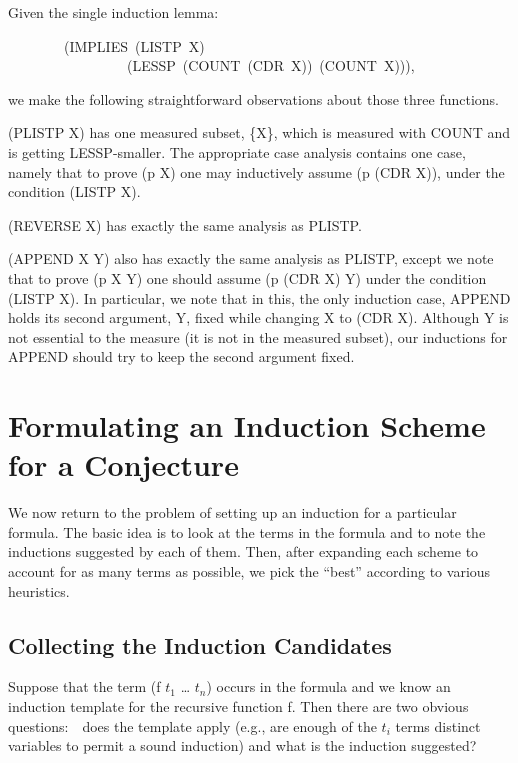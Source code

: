 \documentclass[10pt]{book}
\newenvironment{pubasis}{\begin{flushleft}}{\end{flushleft}}
\begin{document}
Given the single induction lemma:
\begin{pubasis}
~~~~~~~~(IMPLIES~(LISTP~X)\\
~~~~~~~~~~~~~~~~~(LESSP~(COUNT~(CDR~X))~(COUNT~X))),\\
\end{pubasis}
we make
the following straightforward observations about those three functions.

(PLISTP X) has one measured subset, \{X\}, which is measured with COUNT
and is getting LESSP-smaller.  The appropriate case analysis contains
one case, namely that to prove (p X) one may inductively assume (p (CDR X)),
under the condition (LISTP X).

(REVERSE X) has exactly the same analysis as PLISTP.

(APPEND X Y) also has exactly the same analysis as PLISTP, except
we note that to prove (p X Y) one should assume (p (CDR X) Y) under the
condition (LISTP X).  In particular, we note that in this, the only induction case,
APPEND holds its second argument, Y, fixed while changing X to (CDR X).
Although Y is not essential to the measure (it is not in the
measured subset), our inductions for APPEND should try to keep
the second argument fixed.

\chapter{Formulating an Induction Scheme for a Conjecture}
\pagestyle{headings}
\label{SECINDUCTION}
We now return to the problem of setting up an induction for a particular
formula.  The basic idea is to look at the terms in the formula
and to note the inductions suggested by each of them.  Then, after expanding
each scheme to account for as many terms as
possible, we  pick the ``best'' according to various heuristics.

\section{Collecting the Induction Candidates}
Suppose that the term (f $t_{1}$ \ldots{} $t_{n}$) occurs in the formula
and we know an induction template for the recursive function f.  Then
there are two obvious questions:~~does the template  apply
(e.g., are enough of the  $t_{i}$ terms distinct variables to permit a sound induction)
and what is the induction suggested?
\end{document}
